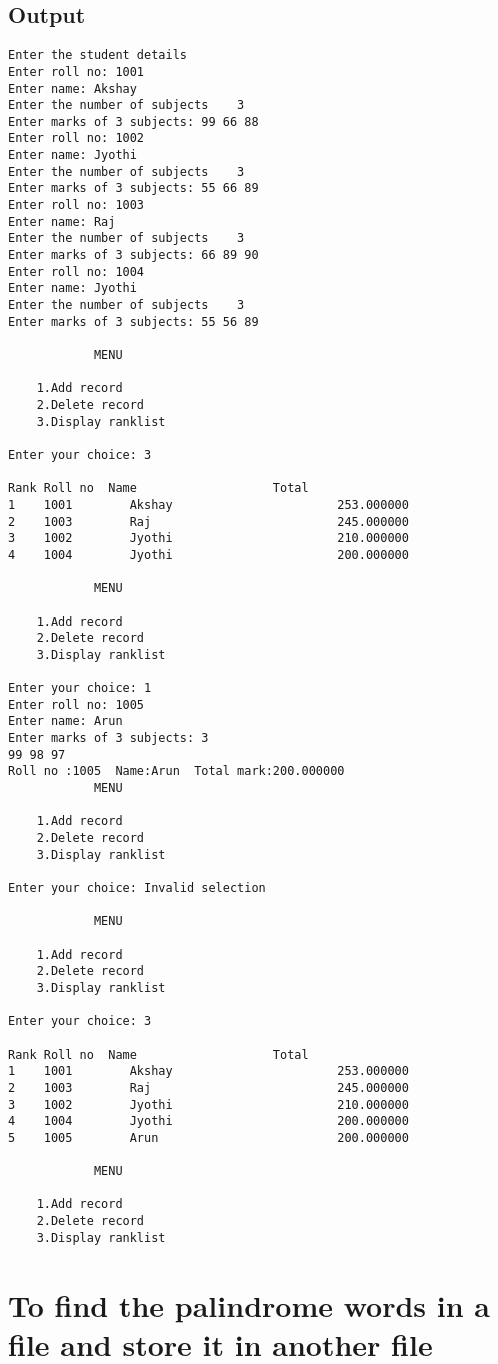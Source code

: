 \documentclass[pdftex,12pt,a4paper]{report}
\begin{document}
\subsection*{Output}
\begin{lstlisting}
Enter the student details 
Enter roll no: 1001
Enter name: Akshay
Enter the number of subjects	3
Enter marks of 3 subjects: 99 66 88
Enter roll no: 1002
Enter name: Jyothi
Enter the number of subjects	3
Enter marks of 3 subjects: 55 66 89
Enter roll no: 1003
Enter name: Raj
Enter the number of subjects	3
Enter marks of 3 subjects: 66 89 90
Enter roll no: 1004
Enter name: Jyothi
Enter the number of subjects	3
Enter marks of 3 subjects: 55 56 89

			MENU

	1.Add record
	2.Delete record
	3.Display ranklist

Enter your choice: 3

Rank Roll no  Name                   Total
1    1001        Akshay                       253.000000
2    1003        Raj                          245.000000
3    1002        Jyothi                       210.000000
4    1004        Jyothi                       200.000000

			MENU

	1.Add record
	2.Delete record
	3.Display ranklist

Enter your choice: 1
Enter roll no: 1005
Enter name: Arun
Enter marks of 3 subjects: 3
99 98 97
Roll no :1005  Name:Arun  Total mark:200.000000
			MENU

	1.Add record
	2.Delete record
	3.Display ranklist

Enter your choice: Invalid selection

			MENU

	1.Add record
	2.Delete record
	3.Display ranklist

Enter your choice: 3

Rank Roll no  Name                   Total
1    1001        Akshay                       253.000000
2    1003        Raj                          245.000000
3    1002        Jyothi                       210.000000
4    1004        Jyothi                       200.000000
5    1005        Arun                         200.000000

			MENU

	1.Add record
	2.Delete record
	3.Display ranklist

\end{lstlisting}


\newpage
\section*{To find the palindrome words in a file and store it in another file}

\end{document}
